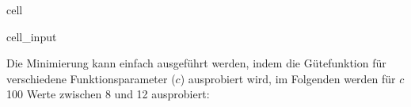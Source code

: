 \documentclass[letterpaper,10pt,english]{jupyterBook}
\begin{document}
\begin{sphinxuseclass}{cell}\begin{sphinxVerbatimInput}

\begin{sphinxuseclass}{cell_input}
\begin{sphinxVerbatim}[commandchars=\\\{\}]
  
       

  
     
\end{sphinxVerbatim}

\end{sphinxuseclass}\end{sphinxVerbatimInput}

\end{sphinxuseclass}
\sphinxAtStartPar
Die Minimierung kann einfach ausgeführt werden, indem die Gütefunktion für verschiedene Funktionsparameter (\(c\)) ausprobiert wird, im Folgenden werden für \(c\) 100 Werte zwischen 8 und 12 ausprobiert:
\end{document}
